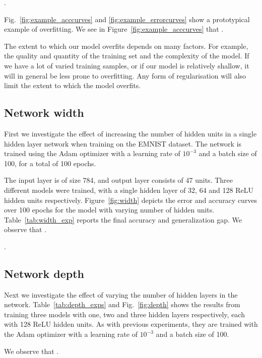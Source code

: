\documentclass{article}
\begin{document}
\questionSix.

Fig.~\ref{fig:example_acccurves} and \ref{fig:example_errorcurves} show a prototypical example of overfitting.
We see in Figure~\ref{fig:example_acccurves} that \questionSeven.

The extent to which our model overfits depends on many factors.
For example, the quality and quantity of the training set and
the complexity of the model. If we have a lot of varied training samples,
or if our model is relatively shallow, it will in general
be less prone to overfitting. Any form of regularisation
will also limit the extent to which the model overfits.


\subsection{Network width}

\questionTableOne
\questionFigureTwo


First we investigate the effect of increasing the number of
hidden units in a single hidden layer network when training
on the EMNIST dataset.
The network is trained using the Adam optimizer
with a learning rate of $10^{-3}$ and a batch size of 100, for a total of 100 epochs.


The input layer is of size 784, and output layer consists
of 47 units. 
Three different models were trained, with a
single hidden layer of 32, 64 and 128 ReLU hidden units
respectively.
Figure~\ref{fig:width} depicts the error and accuracy curves over 100 epochs for the model with varying number of hidden units.
Table~\ref{tab:width_exp} reports the final accuracy and generalization gap.
We observe that \questionEight.

\questionNine.


\subsection{Network depth}

\questionTableTwo
\questionFigureThree

Next we investigate the effect of varying the number of hidden
layers in the network. 
Table~\ref{tab:depth_exps} and Fig.~\ref{fig:depth} shows the results from
training three models with one, two and three hidden layers respectively,
each with 128 ReLU hidden units. 
As with previous experiments, they are 
trained with the Adam optimizer with a learning rate of  $10^{-3}$ and 
a batch size of 100. 

We observe that \questionTen.
\end{document}
